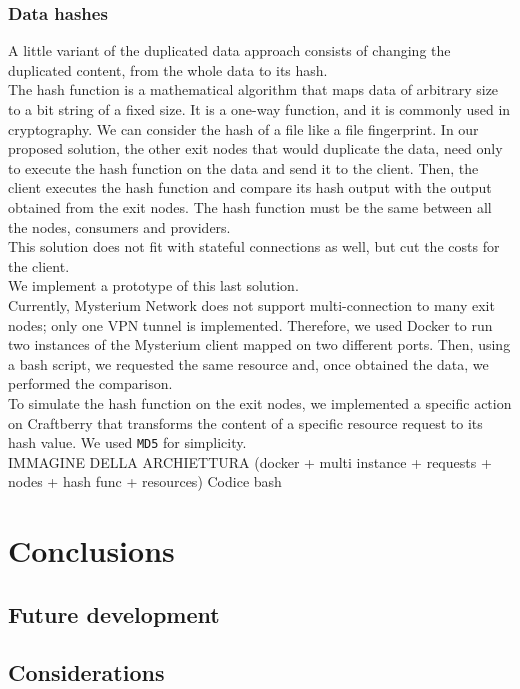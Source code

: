 \documentclass[12pt]{article}
\begin{document}
		\subsubsection{Data hashes}
		A little variant of the duplicated data approach consists of changing the duplicated content, from the whole data to its hash.\\
		The hash function is a mathematical algorithm that maps data of arbitrary size to a bit string of a fixed size. It is a one-way function, and it is commonly used in cryptography. We can consider the hash of a file like a file fingerprint. In our proposed solution, the other exit nodes that would duplicate the data, need only to execute the hash function on the data and send it to the client. Then, the client executes the hash function and compare its hash output with the output obtained from the exit nodes. The hash function must be the same between all the nodes, consumers and providers.\\
		\bigbreak
		This solution does not fit with stateful connections as well, but cut the costs for the client.\\
		\bigbreak
		We implement a prototype of this last solution.\\
		Currently, Mysterium Network does not support multi-connection to many exit nodes; only one VPN tunnel is implemented. Therefore, we used Docker to run two instances of the Mysterium client mapped on two different ports. Then, using a bash script, we requested the same resource and, once obtained the data, we performed the comparison.\\
		To simulate the hash function on the exit nodes, we implemented a specific action on Craftberry that transforms the content of a specific resource request to its hash value. We used \lstinline{MD5} for simplicity.\\
		\bigbreak
		IMMAGINE DELLA ARCHIETTURA (docker +  multi instance + requests + nodes + hash func + resources)
		\bigbreak
		Codice bash
		\bigbreak
		
\section{Conclusions}
	\subsection{Future development}
	\subsection{Considerations}
\end{document}
